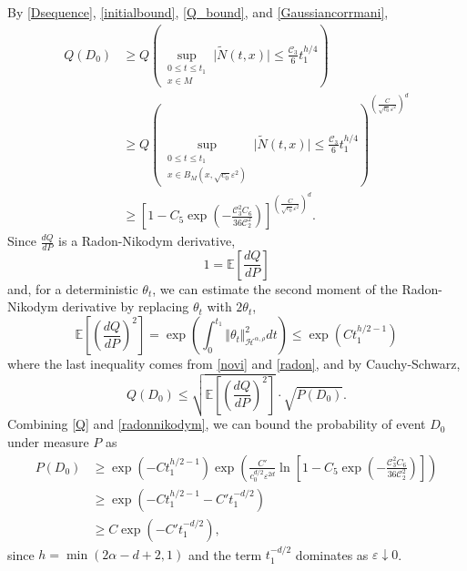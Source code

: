 \documentclass[12pt]{amsart}
\numberwithin{equation}{section}
\newcommand{\E}{\mathbb{E}}
\newcommand{\1}{\mathbf{1}}
\begin{document}
By \eqref{Dsequence}, \eqref{initialbound}, \eqref{Q_bound}, and \eqref{Gaussiancorrmani},
\begin{equation}
\label{Q}
\begin{split}
Q(D_0)&\geq Q\left(\sup_{\substack{0\leq t\leq t_1\\ x\in M}}\vert \widetilde{N}(t,x)\vert\leq\frac{\mathcal{C}_3}{6}t_1^{h/4}\right)\\
&\geq Q\left(\sup_{\substack{0\leq t\leq t_1\\ x\in B_M(x,\sqrt{c_0}\varepsilon^2)}}\vert \widetilde{N}(t,x)\vert\leq\frac{\mathcal{C}_3}{6}t_1^{h/4}\right)^{\left(\frac{C}{\sqrt{c_0}\varepsilon^2}\right)^d}\\
&\geq \left[1-C_5\exp\left(-\frac{\mathcal{C}_3^2C_6}{36\mathcal{C}_2^2}\right)\right]^{\left(\frac{C}{\sqrt{c_0}\varepsilon^2}\right)^d}.
\end{split}
\end{equation}
Since $\frac{dQ}{dP}$ is a Radon-Nikodym derivative,
\begin{equation}
\label{radon}
1=\E\left[\frac{dQ}{dP}\right]
\end{equation}
and, for a deterministic $\theta_t$, we can estimate the second moment of the Radon-Nikodym derivative by replacing $\theta_t$ with $2\theta_t$,
\begin{equation}
\label{radonnikodym}
\E\left[\left(\frac{dQ}{dP}\right)^2\right]=\exp\left(\int_0^{t_1}\Vert \theta_t\Vert^2_{\mathcal{H}^{\alpha,\rho}}dt\right)\leq \exp\left(Ct_1^{h/2-1}\right)
\end{equation}
where the last inequality comes from \eqref{novi} and \eqref{radon}, and by Cauchy-Schwarz,
\[Q(D_0)\leq \sqrt{\E\left[\left(\frac{dQ}{dP}\right)^2\right]}\cdot\sqrt{P(D_0)}.\]
Combining \eqref{Q} and \eqref{radonnikodym}, we can bound the probability of event $D_0$ under measure $P$ as
\begin{equation}
\label{probD}
\begin{split}
P(D_0)&\geq \exp\left(-Ct_1^{h/2-1}\right)\exp\left(\frac{C'}{c_0^{d/2}\varepsilon^{2d}}\ln\left[1-C_5\exp\left(-\frac{\mathcal{C}_3^2C_6}{36\mathcal{C}_2^2}\right)\right]\right)\\
&\geq \exp\left(-Ct_1^{h/2-1}-C't_1^{-d/2}\right)\\
&\geq C\exp\left(-C't_1^{-d/2}\right),
\end{split}
\end{equation}
since $h=\min(2\alpha-d+2,1)$ and the term $t_1^{-d/2}$ dominates as $\varepsilon\downarrow0$.
\end{document}
